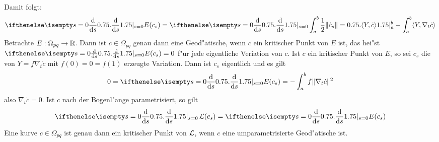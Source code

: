Damit folgt:
\begin{align*}
	\difffrac[s=0]{}{s} E(c_s) = \difffrac[s=0]{}{s} \int_a^b \frac{1}{2} \|\dot c_s\| = \left. \langle Y, \dot c \rangle \right|_a^b - \int_a^b \langle Y, \nabla_t \dot c \rangle
\end{align*}
Betrachte $E: \Omega_{pq} \to \operatorname{\mathbb{R}}$. Dann ist $c \in \Omega_{pq}$ genau dann eine Geod"atische, wenn $c$ ein kritischer Punkt von $E$ ist, das hei"st $\difffrac[s=0]{}{s}E(c_s) = 0$ f"ur jede eigentliche Veriation von $c$.
Ist $c$ ein kritischer Punkt von $E$, so sei $c_s$ die von $Y = f \nabla_t \dot c$ mit $f(0) = 0 = f(1)$ erzeugte Variation.
Dann ist $c_s$ eigentlich und es gilt
\begin{align*}
	0 = \difffrac[s=0]{}{s} E(c_s) = - \int_a^b f \|\nabla_t \dot c\|^2
\end{align*}
also $\nabla_t \dot c = 0$.
Ist $c$ nach der Bogenl"ange parametrisiert, so gilt
\begin{align*}
	\difffrac[s=0]{}{s} \calL(c_s) = \difffrac[s=0]{}{s} E(c_s)
\end{align*}
Eine kurve $c \in \Omega_{pq}$ ist genau dann ein kritischer Punkt von $\operatorname{\mathcal{L}}$, wenn $c$ eine umparametrisierte Geod"atische ist.